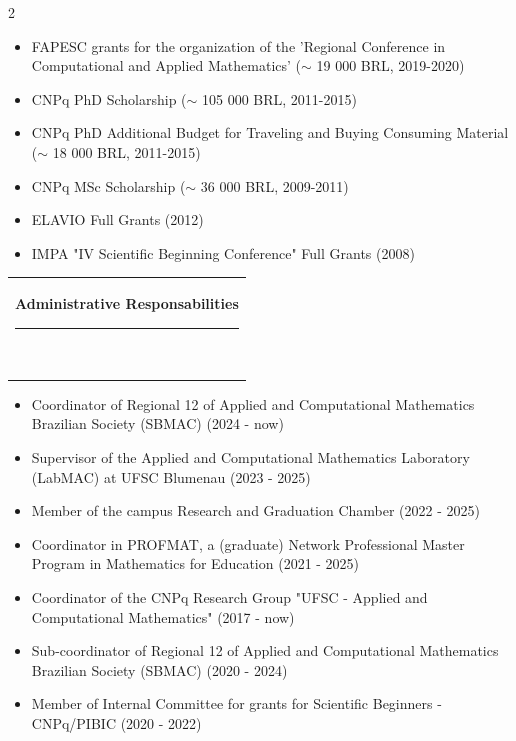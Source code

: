 \documentclass[10pt,A4,english]{article}
\newcommand{\mpwidth}{\linewidth-\fboxsep-\fboxsep}
\newcommand{\cvtext}[1] {
	\begin{tabular*}{1\mpwidth}{p{1.05\mpwidth}}
		\parbox{1\mpwidth}{#1}
	\end{tabular*}
}
\newcommand{\cvsection}[1] {
	\vspace{14pt}
	\cvtext{
		\textbf{\LARGE{\textcolor{darkcol}{#1}}}\\[-4pt]
		\textcolor{accentcol}{ \rule{0.2\textwidth}{1.5pt} } \\
	}
}
\begin{document}
\begin{paracol}{2}
\begin{rightcolumn}
\begin{itemize}[leftmargin=*]
\item FAPESC grants for the organization of the 'Regional Conference in Computational and Applied Mathematics' ($\sim$ 19 000 BRL, 2019-2020)

\item CNPq PhD Scholarship ($\sim$ 105 000 BRL, 2011-2015)
 
\item CNPq PhD Additional Budget for Traveling and Buying Consuming Material 
\newline 
($\sim$ 18 000 BRL, 2011-2015)

\item CNPq MSc Scholarship ($\sim$ 36 000 BRL, 2009-2011)

\item ELAVIO Full Grants (2012)

\item IMPA "IV Scientific Beginning Conference" Full Grants (2008)

\end{itemize}


\bigskip 

\cvsection{Administrative Responsabilities}

\begin{itemize}[leftmargin=*]

\item Coordinator of Regional 12 of Applied and Computational Mathematics Brazilian Society (SBMAC) (2024 - now)

\item Supervisor of the Applied and Computational Mathematics Laboratory (LabMAC) at UFSC Blumenau (2023 - 2025)

\item Member of the campus Research and Graduation Chamber (2022 - 2025)

\item Coordinator in PROFMAT, a (graduate) Network Professional Master Program in Mathematics for Education (2021 - 2025)

\item Coordinator of the CNPq Research Group "UFSC - Applied and Computational Mathematics" (2017 - now)

\item Sub-coordinator of Regional 12 of Applied and Computational Mathematics Brazilian Society (SBMAC) (2020 - 2024)

\item Member of Internal Committee for grants for Scientific Beginners  - CNPq/PIBIC (2020 - 2022)


\end{itemize}
\end{rightcolumn}
\end{paracol}
\end{document}
